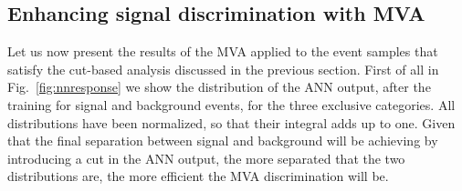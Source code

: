 \subsection{Enhancing signal discrimination with MVA}

Let us now present the results of the MVA applied to the event samples
that satisfy the cut-based analysis discussed in the previous section.
%
First of all in Fig.~\ref{fig:nnresponse} we show the distribution of
the ANN output, after the training for signal and background events, for the three
exclusive categories.
%
All distributions have been normalized, so that their integral
  adds up to one.
%
Given that the final separation between signal and background will be achieving by introducing
a cut in the ANN output, the more separated that the two distributions are, the more efficient
the MVA discrimination will be.



